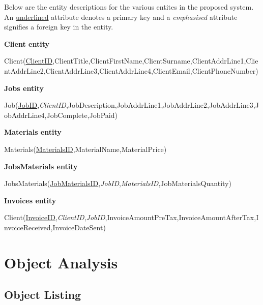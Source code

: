 \begin{flushleft}

Below are the entity descriptions for the various entites in the proposed system. An \underline{underlined} attribute denotes a primary key and a \emph{emphasised}	attribute signifies a foreign key in the entity.

\end{flushleft}


\textbf{Client entity}

\begin{center}
	Client(\underline{ClientID},ClientTitle,ClientFirstName,ClientSurname,ClientAddrLine1,ClientAddrLine2,ClientAddrLine3,ClientAddrLine4,ClientEmail,ClientPhoneNumber)
\end{center}

\textbf{Jobs entity}

\begin{center}
Job(\underline{JobID},\emph{ClientID},JobDescription,JobAddrLine1,JobAddrLine2,JobAddrLine3,JobAddrLine4,JobComplete,JobPaid)
\end{center}

\textbf{Materials entity}

\begin{center}
Materials(\underline{MaterialsID},MaterialName,MaterialPrice)
\end{center}

\textbf{JobsMaterials entity}

\begin{center}
JobsMaterials(\underline{JobMaterialsID},\emph{JobID},\emph{MaterialsID},JobMaterialsQuantity)
\end{center}

\textbf{Invoices entity}

\begin{center}
Client(\underline{InvoiceID},\emph{ClientID},\emph{JobID},InvoiceAmountPreTax,InvoiceAmountAfterTax,InvoiceReceived,InvoiceDateSent)
\end{center}




\section{Object Analysis}

\subsection{Object Listing}



